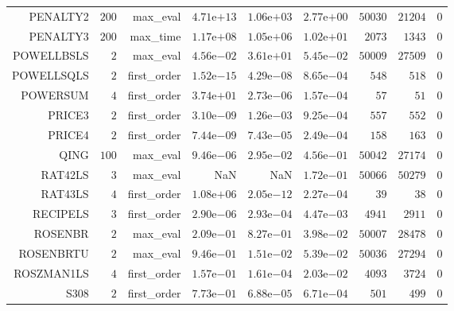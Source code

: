 \begin{longtable}{rrrrrrrrr}
PENALTY2 & \(   200\) & max\_eval & \( 4.71\)e\(+13\) & \( 1.06\)e\(+03\) & \( 2.77\)e\(+00\) & \( 50030\) & \( 21204\) & \(     0\) \\
PENALTY3 & \(   200\) & max\_time & \( 1.17\)e\(+08\) & \( 1.05\)e\(+06\) & \( 1.02\)e\(+01\) & \(  2073\) & \(  1343\) & \(     0\) \\
POWELLBSLS & \(     2\) & max\_eval & \( 4.56\)e\(-02\) & \( 3.61\)e\(+01\) & \( 5.45\)e\(-02\) & \( 50009\) & \( 27509\) & \(     0\) \\
POWELLSQLS & \(     2\) & first\_order & \( 1.52\)e\(-15\) & \( 4.29\)e\(-08\) & \( 8.65\)e\(-04\) & \(   548\) & \(   518\) & \(     0\) \\
POWERSUM & \(     4\) & first\_order & \( 3.74\)e\(+01\) & \( 2.73\)e\(-06\) & \( 1.57\)e\(-04\) & \(    57\) & \(    51\) & \(     0\) \\
PRICE3 & \(     2\) & first\_order & \( 3.10\)e\(-09\) & \( 1.26\)e\(-03\) & \( 9.25\)e\(-04\) & \(   557\) & \(   552\) & \(     0\) \\
PRICE4 & \(     2\) & first\_order & \( 7.44\)e\(-09\) & \( 7.43\)e\(-05\) & \( 2.49\)e\(-04\) & \(   158\) & \(   163\) & \(     0\) \\
QING & \(   100\) & max\_eval & \( 9.46\)e\(-06\) & \( 2.95\)e\(-02\) & \( 4.56\)e\(-01\) & \( 50042\) & \( 27174\) & \(     0\) \\
RAT42LS & \(     3\) & max\_eval &       NaN &       NaN & \( 1.72\)e\(-01\) & \( 50066\) & \( 50279\) & \(     0\) \\
RAT43LS & \(     4\) & first\_order & \( 1.08\)e\(+06\) & \( 2.05\)e\(-12\) & \( 2.27\)e\(-04\) & \(    39\) & \(    38\) & \(     0\) \\
RECIPELS & \(     3\) & first\_order & \( 2.90\)e\(-06\) & \( 2.93\)e\(-04\) & \( 4.47\)e\(-03\) & \(  4941\) & \(  2911\) & \(     0\) \\
ROSENBR & \(     2\) & max\_eval & \( 2.09\)e\(-01\) & \( 8.27\)e\(-01\) & \( 3.98\)e\(-02\) & \( 50007\) & \( 28478\) & \(     0\) \\
ROSENBRTU & \(     2\) & max\_eval & \( 9.46\)e\(-01\) & \( 1.51\)e\(-02\) & \( 5.39\)e\(-02\) & \( 50036\) & \( 27294\) & \(     0\) \\
ROSZMAN1LS & \(     4\) & first\_order & \( 1.57\)e\(-01\) & \( 1.61\)e\(-04\) & \( 2.03\)e\(-02\) & \(  4093\) & \(  3724\) & \(     0\) \\
S308 & \(     2\) & first\_order & \( 7.73\)e\(-01\) & \( 6.88\)e\(-05\) & \( 6.71\)e\(-04\) & \(   501\) & \(   499\) & \(     0\) \\

\end{longtable}
